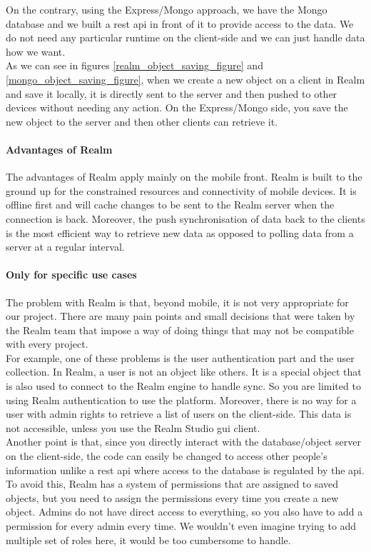 \documentclass[twoside, openright,11pt,a4paper]{book}
\begin{document}
On the contrary, using the Express/Mongo approach, we have the Mongo database and we built a \gls{rest} \gls{api} in front of it to provide access to the data. We do not need any particular runtime on the client-side and we can just handle data how we want. \\

As we can see in figures \ref{realm_object_saving_figure} and \ref{mongo_object_saving_figure}, when we create a new object on a client in Realm and save it locally, it is directly sent to the server and then pushed to other devices without needing any action. On the Express/Mongo side, you save the new object to the server and then other clients can retrieve it. \\
\paragraph{Advantages of Realm}
The advantages of Realm apply mainly on the mobile front. Realm is built to the ground up for the constrained resources and connectivity of mobile devices. It is offline first and will cache changes to be sent to the Realm server when the connection is back. Moreover, the push synchronisation of data back to the clients is the most efficient way to retrieve new data as opposed to polling data from a server at a regular interval.
\paragraph{Only for specific use cases}
The problem with Realm is that, beyond mobile, it is not very appropriate for our project. There are many pain points and small decisions that were taken by the Realm team that impose a way of doing things that may not be compatible with every project.\\

For example, one of these problems is the user authentication part and the user collection. In Realm, a user is not an object like others. It is a special object that is also used to connect to the Realm engine to handle sync. So you are limited to using Realm authentication to use the platform. Moreover, there is no way for a user with admin rights to retrieve a list of users on the client-side. This data is not accessible, unless you use the Realm Studio \gls{gui} client.\\

Another point is that, since you directly interact with the database/object server on the client-side, the code can easily be changed to access other people's information unlike a \gls{rest} \gls{api} where access to the database is regulated by the \gls{api}. To avoid this, Realm has a system of permissions that are assigned to saved objects, but you need to assign the permissions every time you create a new object. Admins do not have direct access to everything, so you also have to add a permission for every admin every time. We wouldn't even imagine trying to add multiple set of roles here, it would be too cumbersome to handle.\\
\end{document}
